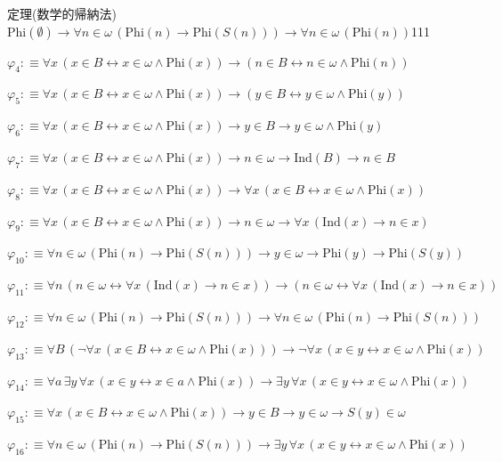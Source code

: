 \begin{fullproof}{定理(数学的帰納法)}{$\mathrm{Phi}(\emptyset) \to \forall n \in \omega\,(\mathrm{Phi}(n) \to \mathrm{Phi}(S(n))) \to \forall n \in \omega\,(\mathrm{Phi}(n))$}{111}
\begin{abbrevlist}
\item $\varphi_{4} :\equiv \forall x\,(x \in B \leftrightarrow x \in \omega \land \mathrm{Phi}(x)) \to (n \in B \leftrightarrow n \in \omega \land \mathrm{Phi}(n))$
\item $\varphi_{5} :\equiv \forall x\,(x \in B \leftrightarrow x \in \omega \land \mathrm{Phi}(x)) \to (y \in B \leftrightarrow y \in \omega \land \mathrm{Phi}(y))$
\item $\varphi_{6} :\equiv \forall x\,(x \in B \leftrightarrow x \in \omega \land \mathrm{Phi}(x)) \to y \in B \to y \in \omega \land \mathrm{Phi}(y)$
\item $\varphi_{7} :\equiv \forall x\,(x \in B \leftrightarrow x \in \omega \land \mathrm{Phi}(x)) \to n \in \omega \to \mathrm{Ind}(B) \to n \in B$
\item $\varphi_{8} :\equiv \forall x\,(x \in B \leftrightarrow x \in \omega \land \mathrm{Phi}(x)) \to \forall x\,(x \in B \leftrightarrow x \in \omega \land \mathrm{Phi}(x))$
\item $\varphi_{9} :\equiv \forall x\,(x \in B \leftrightarrow x \in \omega \land \mathrm{Phi}(x)) \to n \in \omega \to \forall x\,(\mathrm{Ind}(x) \to n \in x)$
\item $\varphi_{10} :\equiv \forall n \in \omega\,(\mathrm{Phi}(n) \to \mathrm{Phi}(S(n))) \to y \in \omega \to \mathrm{Phi}(y) \to \mathrm{Phi}(S(y))$
\item $\varphi_{11} :\equiv \forall n\,(n \in \omega \leftrightarrow \forall x\,(\mathrm{Ind}(x) \to n \in x)) \to (n \in \omega \leftrightarrow \forall x\,(\mathrm{Ind}(x) \to n \in x))$
\item $\varphi_{12} :\equiv \forall n \in \omega\,(\mathrm{Phi}(n) \to \mathrm{Phi}(S(n))) \to \forall n \in \omega\,(\mathrm{Phi}(n) \to \mathrm{Phi}(S(n)))$
\item $\varphi_{13} :\equiv \forall B\,(\neg \forall x\,(x \in B \leftrightarrow x \in \omega \land \mathrm{Phi}(x))) \to \neg \forall x\,(x \in y \leftrightarrow x \in \omega \land \mathrm{Phi}(x))$
\item $\varphi_{14} :\equiv \forall a\,\exists y\,\forall x\,(x \in y \leftrightarrow x \in a \land \mathrm{Phi}(x)) \to \exists y\,\forall x\,(x \in y \leftrightarrow x \in \omega \land \mathrm{Phi}(x))$
\item $\varphi_{15} :\equiv \forall x\,(x \in B \leftrightarrow x \in \omega \land \mathrm{Phi}(x)) \to y \in B \to y \in \omega \to S(y) \in \omega$
\item $\varphi_{16} :\equiv \forall n \in \omega\,(\mathrm{Phi}(n) \to \mathrm{Phi}(S(n))) \to \exists y\,\forall x\,(x \in y \leftrightarrow x \in \omega \land \mathrm{Phi}(x))$

\end{abbrevlist}
\end{fullproof}
